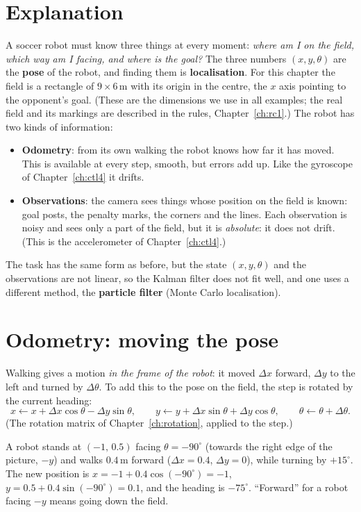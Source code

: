 \label{ch:ctl5}

\section*{Explanation}
A soccer robot must know three things at every moment: \emph{where am I on the field, which way am I facing, and where is the goal?} The three numbers $(x,y,\theta)$ are the \textbf{pose} of the robot, and finding them is \textbf{localisation}. For this chapter the field is a rectangle of $9\times6$\,m with its origin in the centre, the $x$ axis pointing to the opponent's goal. (These are the dimensions we use in all examples; the real field and its markings are described in the rules, Chapter~\ref{ch:rc1}.) The robot has two kinds of information:
\begin{itemize}[nosep]
  \item \textbf{Odometry}: from its own walking the robot knows how far it has moved. This is available at every step, smooth, but errors add up. Like the gyroscope of Chapter~\ref{ch:ctl4} it drifts.
  \item \textbf{Observations}: the camera sees things whose position on the field is known: goal posts, the penalty marks, the corners and the lines. Each observation is noisy and sees only a part of the field, but it is \emph{absolute}: it does not drift. (This is the accelerometer of Chapter~\ref{ch:ctl4}.)
\end{itemize}
The task has the same form as before, but the state $(x,y,\theta)$ and the observations are not linear, so the Kalman filter does not fit well, and one uses a different method, the \textbf{particle filter} (Monte Carlo localisation).

\section*{Odometry: moving the pose}
Walking gives a motion \emph{in the frame of the robot}: it moved $\Delta x$ forward, $\Delta y$ to the left and turned by $\Delta\theta$. To add this to the pose on the field, the step is rotated by the current heading:
\[
x\leftarrow x+\Delta x\cos\theta-\Delta y\sin\theta,\qquad
y\leftarrow y+\Delta x\sin\theta+\Delta y\cos\theta,\qquad
\theta\leftarrow\theta+\Delta\theta .
\]
(The rotation matrix of Chapter~\ref{ch:rotation}, applied to the step.)

\begin{example}
A robot stands at $(-1,\,0.5)$ facing $\theta=-90^{\circ}$ (towards the right edge of the picture, $-y$) and walks $0.4$\,m forward ($\Delta x=0.4$, $\Delta y=0$), while turning by $+15^{\circ}$. The new position is
$x=-1+0.4\cos(-90^{\circ})=-1$, $y=0.5+0.4\sin(-90^{\circ})=0.1$, and the heading is $-75^{\circ}$. ``Forward'' for a robot facing $-y$ means going down the field.
\end{example}

